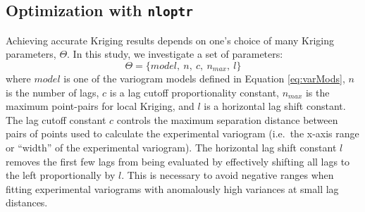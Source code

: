 \hypertarget{nloptr}{%
\subsection{\texorpdfstring{Optimization with \texttt{nloptr}}{Optimization with nloptr}}\label{nloptr}}

Achieving accurate Kriging results depends on one's choice of many Kriging parameters, \(\Theta\). In this study, we investigate a set of parameters:
\begin{equation} 
  \Theta = \{model,\ n,\ c,\ n_{max},\ l\}
  \label{eq:params}
\end{equation}
where \(model\) is one of the variogram models defined in Equation \eqref{eq:varMods}, \(n\) is the number of lags, \(c\) is a lag cutoff proportionality constant, \(n_{max}\) is the maximum point-pairs for local Kriging, and \(l\) is a horizontal lag shift constant. The lag cutoff constant \(c\) controls the maximum separation distance between pairs of points used to calculate the experimental variogram (i.e.~the x-axis range or ``width'' of the experimental variogram). The horizontal lag shift constant \(l\) removes the first few lags from being evaluated by effectively shifting all lags to the left proportionally by \(l\). This is necessary to avoid negative ranges when fitting experimental variograms with anomalously high variances at small lag distances.

